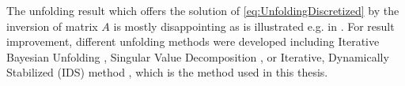 The unfolding result which offers the solution of
\eqref{eq:UnfoldingDiscretized} by the inversion of matrix $A$ is mostly
disappointing as is illustrated e.g. in \cite{UnfoldingExplained}. For result
improvement, different unfolding methods were developed including Iterative
Bayesian Unfolding \cite{IterativeBayesianUnfolding}, Singular Value
Decomposition \cite{SingularValueDecomposition}, or Iterative, Dynamically
Stabilized (IDS) method \cite{IterativeDynamicallyStabilized}, which is the
method used in this thesis. 



